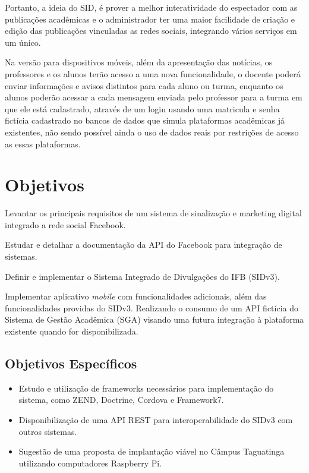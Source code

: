 Portanto, a ideia do SID, é prover a melhor interatividade do espectador com as publicações acadêmicas e o administrador ter uma maior facilidade de criação e edição das publicações vinculadas as redes sociais, integrando vários serviços em um único.

Na versão para dispositivos móveis, além da apresentação das notícias, os professores e os alunos terão acesso a uma nova funcionalidade, o docente poderá enviar informações e avisos distintos para cada aluno ou turma, enquanto os alunos poderão acessar a cada mensagem enviada pelo professor para a turma em que ele está cadastrado, através de um login usando uma matricula e senha fictícia cadastrado no bancos de dados que simula plataformas acadêmicas já existentes, não sendo possível ainda o uso de dados reais por restrições de acesso as essas plataformas.

\section{Objetivos}
Levantar os principais requisitos de um sistema de sinalização e marketing digital integrado a rede social Facebook.

Estudar e detalhar a documentação da API do Facebook para integração de sistemas.

Definir e implementar o Sistema Integrado de Divulgações do IFB (SIDv3).

Implementar aplicativo \textit{mobile} com funcionalidades adicionais, além das funcionalidades providas do SIDv3. Realizando o consumo de um API fictícia do Sistema de Gestão Acadêmica (SGA) visando uma futura integração à plataforma existente quando for disponibilizada.

\subsection{Objetivos Específicos}
	 \begin{itemize}
	\item Estudo e utilização de frameworks necessários para implementação do sistema, como ZEND, Doctrine, Cordova e Framework7.
	 	
	\item Disponibilização de uma API REST para interoperabilidade do SIDv3 com outros sistemas.
	
	\item Sugestão de uma proposta de implantação viável no Câmpus Taguatinga utilizando computadores Raspberry Pi.
	\end{itemize}
	
